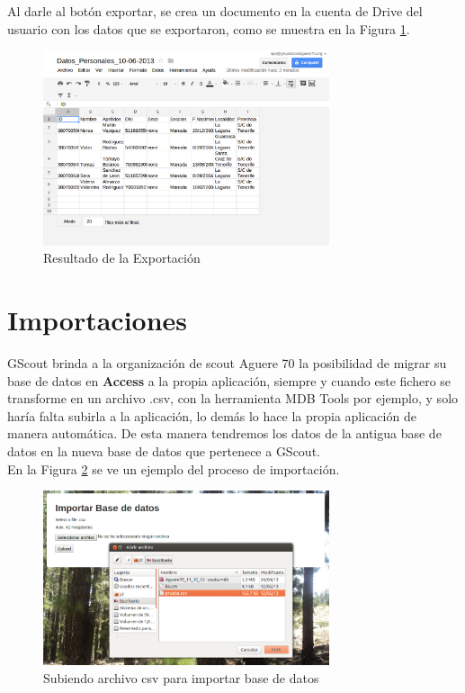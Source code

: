 Al darle al botón exportar, se crea un documento en la cuenta de Drive del usuario con los datos que se exportaron, como se muestra en la Figura \ref{fig:export_drive}.\\

\begin{figure}[H]
\begin{center}
\includegraphics[width=0.75\textwidth]{images/result_export.jpg}
\caption{Resultado de la Exportación}
\label{fig:export_drive}
\end{center}
\end{figure}

\section{Importaciones}
\label{3:sec7}

GScout brinda a la organización de scout Aguere 70 la posibilidad de migrar su base de datos en \textbf{Access} a la propia aplicación, siempre y cuando este fichero se transforme en un archivo .csv, con la herramienta MDB Tools por ejemplo,
y solo haría falta subirla a la aplicación, lo demás lo hace la propia aplicación de manera automática. De esta manera tendremos los datos de la antigua base de datos en la nueva base de datos que pertenece a GScout.\\

En la Figura \ref{fig:import} se ve un ejemplo del proceso de importación.\\ 
\begin{figure}[H]
\begin{center}
\includegraphics[width=0.75\textwidth]{images/import_db.jpg}
\caption{Subiendo archivo csv para importar base de datos}
\label{fig:import}
\end{center}
\end{figure}

